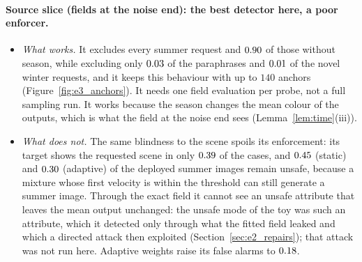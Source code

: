 \documentclass{article}
\theoremstyle{plain}
\theoremstyle{remark}
\begin{document}
\paragraph{Source slice (fields at the noise end): the best detector here, a poor enforcer.}
\begin{itemize}
\item \emph{What works.} It excludes every summer request and $0.90$ of those without season, while excluding only
$0.03$ of the paraphrases and $0.01$ of the novel winter requests, and it keeps this behaviour with up to $140$
anchors (Figure~\ref{fig:e3_anchors}). It needs one field evaluation per probe, not a full sampling run. It works because the season
changes the mean colour of the outputs, which is what the field at the noise end sees (Lemma~\ref{lem:time}(iii)).
\item \emph{What does not.} The same blindness to the scene spoils its enforcement: its target shows the requested scene in only
$0.39$ of the cases, and $0.45$ (static) and $0.30$ (adaptive) of the deployed summer images remain
unsafe, because a mixture whose first velocity is within the threshold can still generate a summer image. Through the exact field it
cannot see an unsafe attribute that leaves the mean output unchanged: the unsafe mode of the toy was such an attribute, which it
detected only through what the fitted field leaked and which a directed attack then exploited (Section~\ref{sec:e2_repairs}); that
attack was not run here. Adaptive weights raise its false alarms to $0.18$.
\end{itemize}
\end{document}
